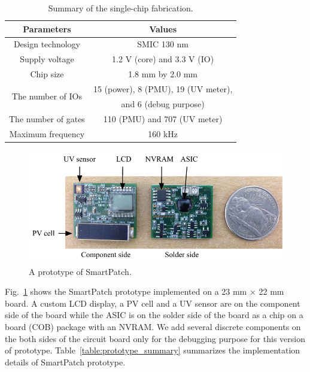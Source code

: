 \documentclass[journal]{IEEEtran}
\begin{document}
\begin{table}
\centering
\caption{Summary of the single-chip fabrication.}
\label{table:fab_summary}
\begin{tabular}{|c|c|}  \hline
Parameters			&Values	\\ \hline \hline
Design technology		&SMIC 130 nm  \\ \hline
Supply voltage		&1.2 V (core) and 3.3 V (IO) \\ \hline
Chip size				&1.8 mm by 2.0 mm \\ \hline
\multirow{2}{*}{The number of IOs}		&15 (power), 8 (PMU), 19 (UV meter), \\
					&and 6 (debug purpose) \\ \hline		
The number of gates	&110 (PMU) and 707 (UV meter) \\ \hline
Maximum frequency	&160 kHz \\ \hline		
\end{tabular}
\end{table}

\begin{figure}
\centering
\includegraphics[width=1.0\hsize]{Figures/prototype.pdf}
\caption{A prototype of SmartPatch.}
\label{fig:prototype}
\end{figure}

Fig.~\ref{fig:prototype} shows the SmartPatch prototype implemented on a 23 mm $\times$ 22 mm board.
A custom LCD display, a PV cell and a UV sensor are on the component side of the board while the ASIC is on the solder side of the board as a chip on a board (COB) package with an NVRAM.
We add several discrete components on the both sides of the circuit board only for the debugging purpose for this version of prototype.
Table~\ref{table:prototype_summary} summarizes the implementation details of SmartPatch prototype.
\end{document}
